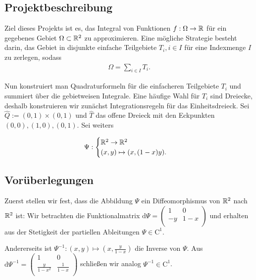 \subsection{Projektbeschreibung}

Ziel dieses Projekts ist es, das Integral von Funktionen $f : \Omega \to \mathbb{R}$ für ein gegebenes Gebiet $\Omega \subset \mathbb{R}^2$ zu approximieren. Eine mögliche Strategie besteht darin, das Gebiet in disjunkte einfache Teilgebiete $T_i, i \in I$ für eine Indexmenge $I$ zu zerlegen, sodass
\begin{align*}
\Omega = \sum_{i \in I}{T_i}.
\end{align*}

Nun konstruiert man Quadraturformeln für die einfacheren Teilgebiete $T_i$ und summiert über die gebietweisen Integrale. Eine häufige Wahl für $T_i$ sind Dreiecke, deshalb konstruieren wir zunächst Integrationsregeln für das Einheitsdreieck. Sei $\hat{Q} := (0, 1) \times (0, 1)$ und $\hat{T}$ das offene Dreieck mit den Eckpunkten $(0, 0), (1, 0), (0, 1)$. Sei weiters

\begin{align*}
    \Psi:
    \begin{cases}
        \mathbb{R}^2    \to     \mathbb{R}^2        \\
        (x, y)  \mapsto (x, (1-x)y).
    \end{cases}
\end{align*}

\subsection{Vorüberlegungen}

Zuerst stellen wir fest, dass die Abbildung $\Psi$ ein Diffeomorphismus von $\mathbb{R}^2$ nach $\mathbb{R}^2$ ist: Wir betrachten die Funktionalmatrix
$\mathrm{d}\Psi =
                \left(\begin{array}{cccc}                                
                1 & 0  \\                                               
                -y & 1-x  \\
                \end{array}
                \right) $
 und erhalten aus der Stetigkeit der partiellen Ableitungen $\Psi \in \mathrm{C^{1}}$.
 
 
 Andererseits ist $\Psi^{-1}: (x, y) \mapsto \left( x, \frac{y}{1-x} \right)$ die Inverse von $\Psi$. Aus $\mathrm{d}\Psi^{-1} =
    \left(\begin{array}{ccccc}                                
                1 & 0  \\                                               
                \frac{y}{1-x^2} & \frac{1}{1-x}  \\
                \end{array}
                \right)$ schließen wir analog $\Psi^{-1} \in \mathrm{C^{1}}$.
 
